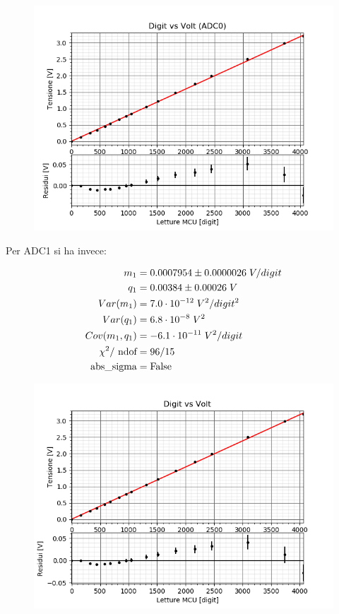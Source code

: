 \documentclass{article}[a4paper, oneside, 11pt]
\begin{document}
\begin{figure}[H]

    \centering

        \includegraphics[scale=0.75]{digitvsvolt_ADC0_1.png}

\end{figure}


Per ADC1 si ha invece:


\begin{align*}
	m_1 &= 0.0007954 \pm 0.0000026  \; V/digit \\
	q_1 &= 0.00384  \pm 0.00026  \; V \\
	Var(m_1) &= 7.0 \cdot 10^{-12}  \; V^2 /digit^2 \\
	Var(q_1) &= 6.8 \cdot 10^{-8} \; V^2 \\
	Cov(m_1, q_1) &= - 6.1 \cdot 10^{-11} \; V^2  /digit \\
	{\chi}^2/\text{ ndof} &= {96}/{15}\\ 
	\text{abs\_sigma} &= \rm False
\end{align*}

\begin{figure}[H]

    \centering

        \includegraphics[scale=0.75]{digitvsvolt_ADC1_1.png}

\end{figure}
\end{document}
